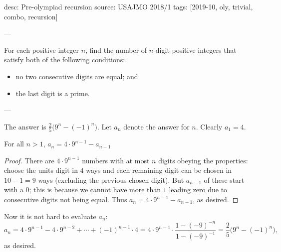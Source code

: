 desc: Pre-olympiad recursion
source: USAJMO 2018/1
tags: [2019-10, oly, trivial, combo, recursion]

---

For each positive integer $n$, find the number of $n$-digit positive integers that satisfy both of the following conditions:
\begin{itemize}[itemsep=0em]
    \item no two consecutive digits are equal; and
    \item the last digit is a prime.
\end{itemize}

---

The answer is $\tfrac25\big(9^n-(-1)^n\big)$. Let $a_n$ denote the answer for $n$. Clearly $a_1=4$.
\begin{iclaim*}
    For all $n>1$, $a_n=4\cdot9^{n-1}-a_{n-1}$
\end{iclaim*}
\begin{proof}
    There are $4\cdot9^{n-1}$ numbers with at most $n$ digits obeying the properties: choose the units digit in $4$ ways and each remaining digit can be chosen in $10-1=9$ ways (excluding the previous chosen digit). But $a_{n-1}$ of these start with a $0$; this is because we cannot have more than $1$ leading zero due to consecutive digits not being equal. Thus $a_n=4\cdot9^{n-1}-a_{n-1}$, as desired.
\end{proof}

Now it is not hard to evaluate $a_n$: \[a_n=4\cdot9^{n-1}-4\cdot9^{n-2}+\cdots+(-1)^{n-1}\cdot4=4\cdot9^{n-1}\cdot\frac{1-(-9)^{-n}}{1-(-9)^{-1}}=\frac25\big(9^n-(-1)^n\big),\]
as desired.
